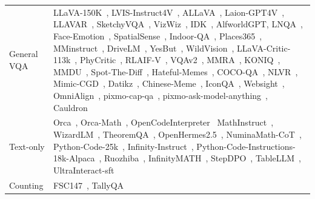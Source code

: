 \begin{table}[!tbp]
{\begin{tabular}{m{1.6cm}|>{\small}m{15.4cm}}
\rowcolor{gray!15}\footnotesize 
General VQA & LLaVA-150K~\cite{liu2023llava}, LVIS-Instruct4V~\cite{wang2023lvisinstruct4v}, ALLaVA~\cite{chen2024allava},  Laion-GPT4V~\cite{laion_gpt4v_dataset}, LLAVAR~\cite{zhang2023llavar}, SketchyVQA~\cite{tu2023many}, VizWiz~\cite{gurari2018vizwiz}, IDK~\cite{cha2024visually}, AlfworldGPT, LNQA~\cite{pont2020connecting_lnqa}, Face-Emotion~\cite{fastjob_visual_emotional_analysis}, SpatialSense~\cite{yang2019spatialsense}, Indoor-QA~\cite{keremberke_indoor_scene_classification}, Places365~\cite{zhou2017places365}, MMinstruct~\cite{liu2024mminstruct}, DriveLM~\cite{sima2023drivelm}, YesBut~\cite{nandy2024yesbut}, WildVision~\cite{lu2024wildvision}, LLaVA-Critic-113k~\cite{xiong2024llava_critic}, PhyCritic~\cite{xiong2026phycritic}, RLAIF-V~\cite{yu2024rlaif_v}, VQAv2~\cite{goyal2017vqav2}, MMRA~\cite{wu2024mmra}, KONIQ~\cite{hosu2020koniq}, MMDU~\cite{liu2024mmdu}, Spot-The-Diff~\cite{jhamtani2018learning_spotthediff}, Hateful-Memes~\cite{kiela2020hateful_memes}, COCO-QA~\cite{ren2015exploring_cocoqa}, NLVR~\cite{suhr2017corpus_nlvr2}, Mimic-CGD~\cite{laurenccon2024matters}, Datikz~\cite{belouadi2023automatikz_datikz},
Chinese-Meme~\cite{emo_visual_data_chinese_meme}, IconQA~\cite{lu2021iconqa}, Websight~\cite{laurenccon2024unlocking_websight}, OmniAlign~\cite{zhao2025omnialign}, pixmo-cap-qa~\cite{deitke2025molmo}, pixmo-ask-model-anything~\cite{deitke2025molmo}, Cauldron~\cite{laurenccon2024matters} \\

\footnotesize 
Text-only & Orca~\cite{lian2023openorca}, Orca-Math~\cite{mitra2024orca}, OpenCodeInterpreter~\cite{zheng2024opencodeinterpreter}
MathInstruct~\cite{yue2023mammoth_mathinstruct}, WizardLM~\cite{xu2023wizardlm}, TheoremQA~\cite{chen2023theoremqa}, OpenHermes2.5~\cite{OpenHermes2_5}, NuminaMath-CoT~\cite{numina_math_datasets}, Python-Code-25k~\cite{flytech_python_codes_25k}, Infinity-Instruct~\cite{baai_infinity_instruct},
Python-Code-Instructions-18k-Alpaca~\cite{iamtarun_python_code_instructions_18k_alpaca}, Ruozhiba~\cite{looksjuicy_ruozhiba}, InfinityMATH~\cite{zhang2024infinitymath}, StepDPO~\cite{lai2024stepDPO}, TableLLM~\cite{zhang2024tablellm}, UltraInteract-sft~\cite{yuan2024advancing_ultrainteract}\\

\rowcolor{gray!15}\footnotesize 
Counting & FSC147~\cite{m_Ranjan-etal-CVPR21}, TallyQA~\cite{acharya2019tallyqa} \\
\end{tabular}}
\label{tab:data_sft}
\end{table}